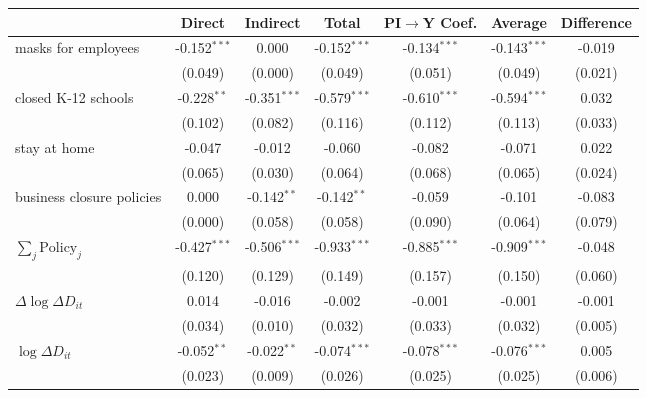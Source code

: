 
\begin{tabular}{lccccc|>{}c}
\toprule
  & Direct & Indirect & Total & PI$\to$Y Coef. & Average & Difference\\
\midrule
masks for employees & -0.152$^{***}$ & 0.000 & -0.152$^{***}$ & -0.134$^{***}$ & -0.143$^{***}$ & -0.019\\
 & (0.049) & (0.000) & (0.049) & (0.051) & (0.049) & (0.021)\\
closed K-12 schools & -0.228$^{**}$ & -0.351$^{***}$ & -0.579$^{***}$ & -0.610$^{***}$ & -0.594$^{***}$ & 0.032\\
 & (0.102) & (0.082) & (0.116) & (0.112) & (0.113) & (0.033)\\
stay at home & -0.047 & -0.012 & -0.060 & -0.082 & -0.071 & 0.022\\
 & (0.065) & (0.030) & (0.064) & (0.068) & (0.065) & (0.024)\\
business closure policies & 0.000 & -0.142$^{**}$ & -0.142$^{**}$ & -0.059 & -0.101 & -0.083\\
 & (0.000) & (0.058) & (0.058) & (0.090) & (0.064) & (0.079)\\
$\sum_j \mathrm{Policy}_j$ & -0.427$^{***}$ & -0.506$^{***}$ & -0.933$^{***}$ & -0.885$^{***}$ & -0.909$^{***}$ & -0.048\\
 & (0.120) & (0.129) & (0.149) & (0.157) & (0.150) & (0.060)\\
$\Delta \log \Delta D_{it}$ & 0.014 & -0.016 & -0.002 & -0.001 & -0.001 & -0.001\\
 & (0.034) & (0.010) & (0.032) & (0.033) & (0.032) & (0.005)\\
$\log \Delta D_{it}$ & -0.052$^{**}$ & -0.022$^{**}$ & -0.074$^{***}$ & -0.078$^{***}$ & -0.076$^{***}$ & 0.005\\
 & (0.023) & (0.009) & (0.026) & (0.025) & (0.025) & (0.006)\\
\bottomrule
\end{tabular}
